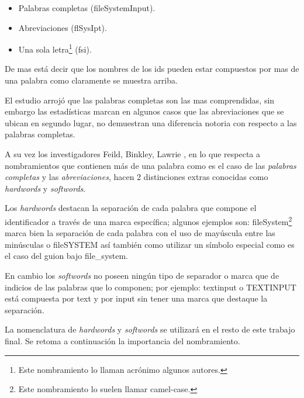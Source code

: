 \documentclass[a4paper,12pt]{report}
\begin{document}
\begin{itemize}
\itemsep0em%
\item Palabras completas (\textsf{fileSystemInput}).
\item Abreviaciones (\textsf{flSysIpt}).
\item Una sola letra\footnote[1]{Este nombramiento lo llaman acrónimo algunos autores.} (\textsf{fsi}). 
\end{itemize}

De mas está decir que los nombres de los ids pueden estar compuestos por mas de una palabra como claramente se muestra arriba.

El estudio arrojó que las palabras completas son las mas comprendidas, sin embargo las estadísticas marcan en algunos casos que las abreviaciones que se ubican en segundo lugar, no demuestran una diferencia notoria con respecto a las palabras completas\cite{DCHD06}.

A su vez los investigadores Feild, Binkley, Lawrie \cite{FBL06,HDD06,DMDJ13}, en lo que respecta a nombramientos que contienen más de una palabra como es el caso de las \textit{palabras completas} y las \textit{abreviaciones}, hacen 2 distinciones extras conocidas como \textit{hardwords} y \textit{softwords}.

Los \textit{hardwords} destacan la separación de cada palabra que compone el identificador a través de una marca específica; algunos ejemplos son: \mbox{\textsf{fileSystem}}\footnote[2]{Este nombramiento lo suelen llamar camel-case.} marca bien la separación de cada palabra con el uso de mayúscula entre las minúsculas o \mbox{\textsf{fileSYSTEM}} así también como utilizar un símbolo especial como es el caso del guion bajo \textsf{file\_system}. 

En cambio los \textit{softwords} no poseen ningún tipo de separador o marca que de indicios de las palabras que lo componen; por ejemplo: \textsf{textinput} o \textsf{TEXTINPUT} está compuesta por \textsf{text} y por \textsf{input} sin tener una marca que destaque la separación.

La nomenclatura de \textit{hardwords} y \textit{softwords} se utilizará en el resto de este trabajo final. Se retoma a  continuación la importancia del nombramiento.

\end{document}
